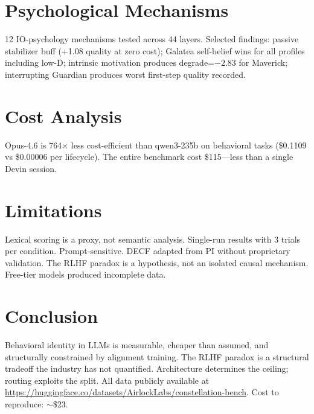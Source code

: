 \documentclass[conference]{IEEEtran}
\begin{document}
\section{Psychological Mechanisms}

12 IO-psychology mechanisms tested across 44 layers. Selected findings: passive stabilizer buff (+1.08 quality at zero cost); Galatea self-belief wins for all profiles including low-D; intrinsic motivation produces degrade=$-2.83$ for Maverick; interrupting Guardian produces worst first-step quality recorded.

\section{Cost Analysis}

Opus-4.6 is 764$\times$ less cost-efficient than qwen3-235b on behavioral tasks (\$0.1109 vs \$0.00006 per lifecycle). The entire benchmark cost \$115---less than a single Devin session.

\section{Limitations}

Lexical scoring is a proxy, not semantic analysis. Single-run results with 3 trials per condition. Prompt-sensitive. DECF adapted from PI without proprietary validation. The RLHF paradox is a hypothesis, not an isolated causal mechanism. Free-tier models produced incomplete data.

\section{Conclusion}

Behavioral identity in LLMs is measurable, cheaper than assumed, and structurally constrained by alignment training. The RLHF paradox is a structural tradeoff the industry has not quantified. Architecture determines the ceiling; routing exploits the split. All data publicly available at \url{https://huggingface.co/datasets/AirlockLabs/constellation-bench}. Cost to reproduce: $\sim$\$23.
\end{document}
